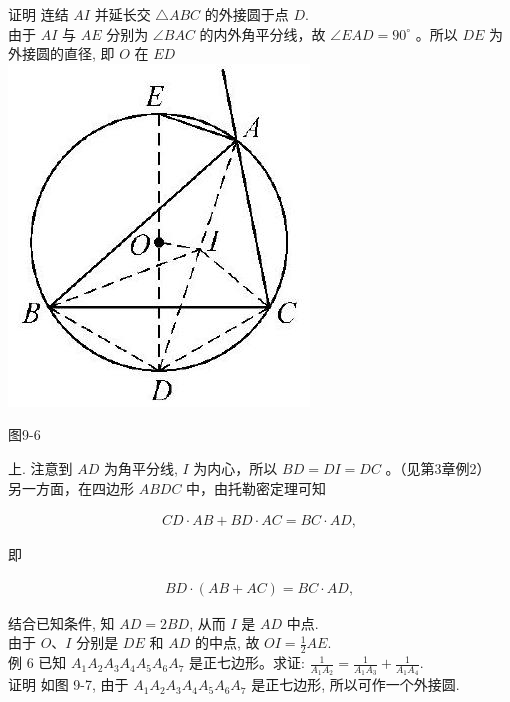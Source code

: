 \documentclass[10pt]{article}
\begin{document}
证明 连结 $A I$ 并延长交 $\triangle A B C$ 的外接圆于点 $D$.\\
由于 $A I$ 与 $A E$ 分别为 $\angle B A C$ 的内外角平分线，故 $\angle E A D=90^{\circ}$ 。所以 $D E$ 为外接圆的直径, 即 $O$ 在 $E D$\\
\includegraphics[max width=\textwidth, center]{2024_10_30_66b8e5e701da2093c133g-067(1)}

图9-6

上. 注意到 $A D$ 为角平分线, $I$ 为内心，所以 $B D=D I=D C$ 。（见第3章例2）\\
另一方面，在四边形 $A B D C$ 中，由托勒密定理可知

\begin{align*}
C D \cdot A B+B D \cdot A C=B C \cdot A D,
\end{align*}

即

\begin{align*}
B D \cdot(A B+A C)=B C \cdot A D,
\end{align*}

结合已知条件, 知 $A D=2 B D$, 从而 $I$ 是 $A D$ 中点.\\
由于 $O 、 I$ 分别是 $D E$ 和 $A D$ 的中点, 故 $O I=\frac{1}{2} A E$.\\
例 6 已知 $A_{1} A_{2} A_{3} A_{4} A_{5} A_{6} A_{7}$ 是正七边形。求证: $\frac{1}{A_{1} A_{2}}=\frac{1}{A_{1} A_{3}}+\frac{1}{A_{1} A_{4}}$.\\
证明 如图 9-7, 由于 $A_{1} A_{2} A_{3} A_{4} A_{5} A_{6} A_{7}$ 是正七边形, 所以可作一个外接圆.
\end{document}
